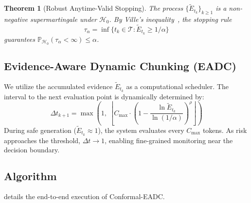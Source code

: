 \documentclass[letterpaper,twocolumn,10pt]{article}
\newcommand{\Hcal}{\mathcal{H}}
\newcommand{\Tcal}{\mathcal{T}}
\newtheorem{theorem}{Theorem}
\begin{document}
\begin{theorem}[Robust Anytime-Valid Stopping]
\label{thm:main}
The process $\{\tilde{E}_{t_k}\}_{k \ge 1}$ is a non-negative supermartingale under $\Hcal_0$.
By Ville's inequality~\cite{ville1939etude}, the stopping rule
\begin{equation}
  \tau_\alpha = \inf\bigl\{t_k \in \Tcal : \tilde{E}_{t_k} \ge 1/\alpha\bigr\}
\end{equation}
guarantees $\mathbb{P}_{\Hcal_0}(\tau_\alpha < \infty) \le \alpha$.
\end{theorem}

\subsection{Evidence-Aware Dynamic Chunking (EADC)}
\label{sec:eadc}

We utilize the accumulated evidence $\tilde{E}_{t_k}$ as a computational scheduler.
The interval to the next evaluation point is dynamically determined by:
\begin{equation}
  \Delta t_{k+1} = \max\!\left(1,\; \left\lfloor C_{\max} \cdot \left(1 - \frac{\ln \tilde{E}_{t_k}}{\ln(1/\alpha)}\right)^{\!\rho}\right\rfloor\right)
  \label{eq:eadc}
\end{equation}
During safe generation ($\tilde{E}_{t_k} \approx 1$), the system evaluates every $C_{\max}$ tokens.
As risk approaches the threshold, $\Delta t \to 1$, enabling fine-grained monitoring near the decision boundary.

\subsection{Algorithm}
 details the end-to-end execution of Conformal-EADC.
\end{document}

